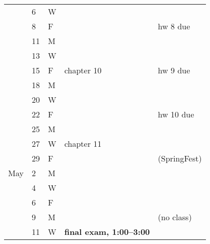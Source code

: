 \documentclass{article}
\begin{document}
\begin{tabular*}{0.99\textwidth}{%
    p{}%
    p{}%
    p{}%
    |p{}%
    |p{}}
& 6 & W & & \\
& 8 & F & & hw 8 due\\
\hline
& 11 & M & & \\
& 13 & W & & \\
& 15 & F & chapter 10& hw 9 due\\
\hline
& 18 & M & & \\
& 20 & W & & \\
& 22 & F & & hw 10 due\\
\hline
& 25 & M & &  \\
& 27 & W & chapter 11& \\
& 29 & F & & (SpringFest) \\
\hline
May
& 2 & M & & \\
& 4 & W & & \\
& 6 & F & & \\
\hline
& 9 & M & & (no class) \\
& 11 & W & \textbf{final exam, 1:00--3:00} & \\ \hline
\end{tabular*}
\end{document}

